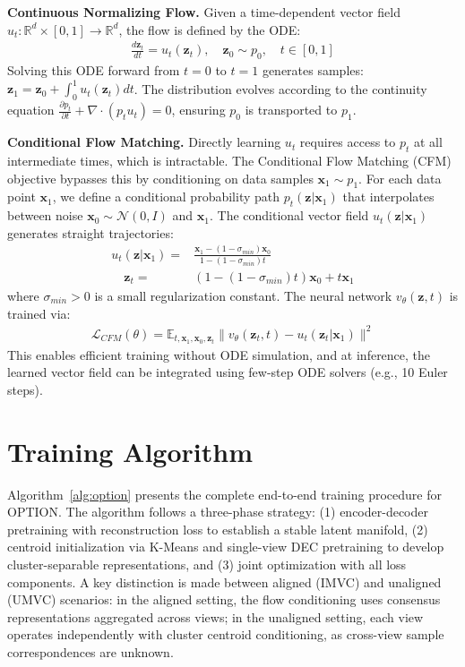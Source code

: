 \documentclass{article}
\theoremstyle{plain}
\theoremstyle{definition}
\theoremstyle{remark}
\begin{document}
\textbf{Continuous Normalizing Flow.} Given a time-dependent vector field $u_t: \mathbb{R}^d \times [0,1] \to \mathbb{R}^d$, the flow is defined by the ODE:
\begin{align}
\frac{d\mathbf{z}_t}{dt} = u_t(\mathbf{z}_t), \quad \mathbf{z}_0 \sim p_0, \quad t \in [0, 1]
\end{align}
Solving this ODE forward from $t=0$ to $t=1$ generates samples: $\mathbf{z}_1 = \mathbf{z}_0 + \int_0^1 u_t(\mathbf{z}_t) dt$. The distribution evolves according to the continuity equation $\frac{\partial p_t}{\partial t} + \nabla \cdot (p_t u_t) = 0$, ensuring $p_0$ is transported to $p_1$.

\textbf{Conditional Flow Matching.} Directly learning $u_t$ requires access to $p_t$ at all intermediate times, which is intractable. The Conditional Flow Matching (CFM) objective \cite{lipmanFlowMatchingGenerative2023a} bypasses this by conditioning on data samples $\mathbf{x}_1 \sim p_1$. For each data point $\mathbf{x}_1$, we define a conditional probability path $p_t(\mathbf{z}|\mathbf{x}_1)$ that interpolates between noise $\mathbf{x}_0 \sim \mathcal{N}(0, I)$ and $\mathbf{x}_1$. The conditional vector field $u_t(\mathbf{z}|\mathbf{x}_1)$ generates straight trajectories:
\begin{align}
u_t(\mathbf{z}|\mathbf{x}_1) = & \frac{\mathbf{x}_1 - (1-\sigma_{min})\mathbf{x}_0}{1 - (1-\sigma_{min})t} \\
\quad \mathbf{z}_t = & (1 - (1-\sigma_{min})t)\mathbf{x}_0 + t\mathbf{x}_1    
\end{align}
where $\sigma_{min} > 0$ is a small regularization constant. The neural network $v_\theta(\mathbf{z}, t)$ is trained via:
\begin{align}
\mathcal{L}_{CFM}(\theta) = \mathbb{E}_{t, \mathbf{x}_1, \mathbf{x}_0, \mathbf{z}_t} \| v_\theta(\mathbf{z}_t, t) - u_t(\mathbf{z}_t|\mathbf{x}_1) \|^2
\end{align}
This enables efficient training without ODE simulation, and at inference, the learned vector field can be integrated using few-step ODE solvers (e.g., 10 Euler steps).

\section{Training Algorithm}
\label{app:algorithm}

Algorithm~\ref{alg:option} presents the complete end-to-end training procedure for OPTION. The algorithm follows a three-phase strategy: (1) encoder-decoder pretraining with reconstruction loss to establish a stable latent manifold, (2) centroid initialization via K-Means and single-view DEC pretraining to develop cluster-separable representations, and (3) joint optimization with all loss components. A key distinction is made between aligned (IMVC) and unaligned (UMVC) scenarios: in the aligned setting, the flow conditioning uses consensus representations aggregated across views; in the unaligned setting, each view operates independently with cluster centroid conditioning, as cross-view sample correspondences are unknown.
\end{document}

